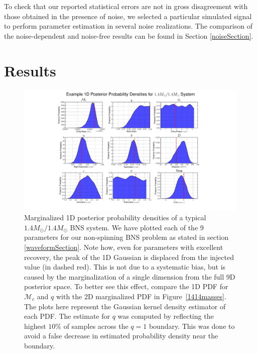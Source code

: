 \documentclass[11pt,a4paper]{emulateapj} 
\begin{document}
To check that our reported statistical errors are not in gross
disagreement with those obtained in the presence of noise, we selected
a particular simulated signal to perform parameter estimation in
several noise realizations.  The comparison of the noise-dependent and
noise-free results can be found in Section \ref{noiseSection}.

\section{Results}
\label{resultsSection} 

\begin{figure}[t!]
\centering \includegraphics[trim=7cm 0cm 0cm 0cm,
  clip=true,scale=0.58]{9dpdf}
\caption{\label{9dPDF} Marginalized 1D  posterior probability densities
  of a typical $1.4M_{\odot}/1.4M_{\odot}$ BNS
  system.  We have plotted each of the 9 parameters for our
  non-spinning BNS problem as stated in section \ref{waveformSection}.
    Note how, even for parameters with excellent recovery, the peak of
  the 1D Gaussian is displaced from the injected value (in dashed
  red).  This is not due to a systematic bias, but is caused by the
  marginalization of a single dimension from the full 9D posterior
  space.  To better see this effect, compare the 1D PDF for
  $\mathcal{M}_{c}$ and $q$ with the 2D marginalized PDF in
  Figure~\ref{1414masses}.  The plots here represent the Gaussian kernel density
  estimator of each PDF.  The estimate for $q$ was 
  computed by reflecting the highest $10\%$ of samples across the $q=1$ boundary.  
  This was done to avoid a false decrease in estimated probability density near
  the boundary.}
\end{figure}
\end{document}
